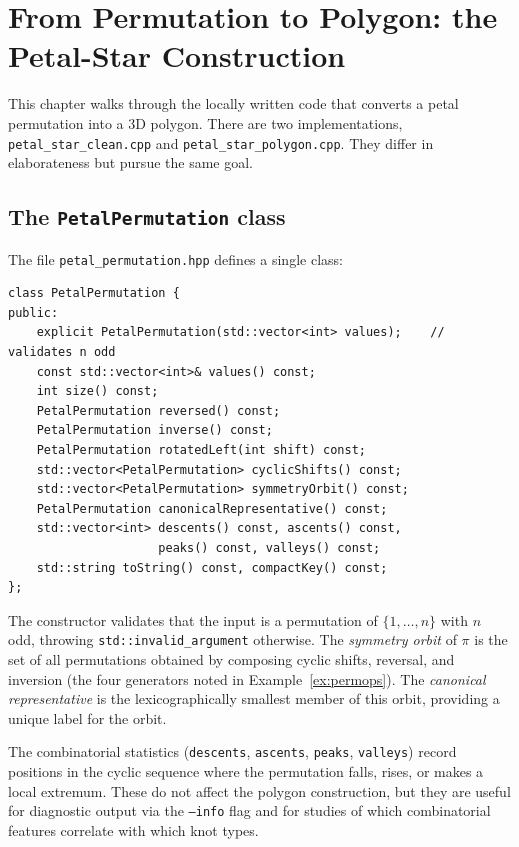 \documentclass[11pt,oneside]{report}
\theoremstyle{definition}
\begin{document}
\chapter{From Permutation to Polygon: the Petal-Star Construction}\label{chap:petalstar}

This chapter walks through the locally written code that converts a petal
permutation into a 3D polygon. There are two implementations,
\texttt{petal\_star\_clean.cpp} and \texttt{petal\_star\_polygon.cpp}.
They differ in elaborateness but pursue the same goal.

\section{The \texttt{PetalPermutation} class}\label{sec:petalperm}

The file \texttt{petal\_permutation.hpp} defines a single class:

\begin{lstlisting}[style=cpp,caption={Selected interface of \texttt{PetalPermutation} (\texttt{petal\_permutation.hpp})},captionpos=b]
class PetalPermutation {
public:
    explicit PetalPermutation(std::vector<int> values);    // validates n odd
    const std::vector<int>& values() const;
    int size() const;
    PetalPermutation reversed() const;
    PetalPermutation inverse() const;
    PetalPermutation rotatedLeft(int shift) const;
    std::vector<PetalPermutation> cyclicShifts() const;
    std::vector<PetalPermutation> symmetryOrbit() const;
    PetalPermutation canonicalRepresentative() const;
    std::vector<int> descents() const, ascents() const,
                     peaks() const, valleys() const;
    std::string toString() const, compactKey() const;
};
\end{lstlisting}

The constructor validates that the input is a permutation of $\{1,\dots,n\}$
with $n$ odd, throwing \texttt{std::invalid\_argument} otherwise. The
\emph{symmetry orbit} of $\pi$ is the set of all permutations obtained by
composing cyclic shifts, reversal, and inversion (the four generators noted
in Example~\ref{ex:permops}). The \emph{canonical representative} is the
lexicographically smallest member of this orbit, providing a unique label
for the orbit.

The combinatorial statistics (\texttt{descents}, \texttt{ascents}, \texttt{peaks},
\texttt{valleys}) record positions in the cyclic sequence where the permutation
falls, rises, or makes a local extremum. These do not affect the polygon
construction, but they are useful for diagnostic output via the
\texttt{--info} flag and for studies of which combinatorial features
correlate with which knot types.
\end{document}

